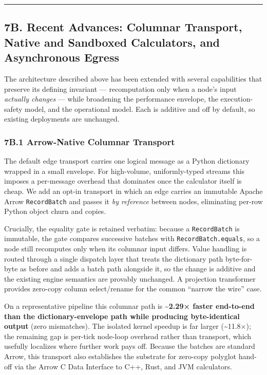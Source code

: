 \documentclass[
]{article}
\begin{document}
\begin{center}\rule{0.5\linewidth}{0.5pt}\end{center}

\hypertarget{b.-recent-advances-columnar-transport-native-and-sandboxed-calculators-and-asynchronous-egress}{%
\subsection{7B. Recent Advances: Columnar Transport, Native and
Sandboxed Calculators, and Asynchronous
Egress}\label{b.-recent-advances-columnar-transport-native-and-sandboxed-calculators-and-asynchronous-egress}}

The architecture described above has been extended with several
capabilities that preserve its defining invariant --- recomputation only
when a node's input \emph{actually changes} --- while broadening the
performance envelope, the execution-safety model, and the operational
model. Each is additive and off by default, so existing deployments are
unchanged.

\hypertarget{b.1-arrow-native-columnar-transport}{%
\subsubsection{7B.1 Arrow-Native Columnar
Transport}\label{b.1-arrow-native-columnar-transport}}

The default edge transport carries one logical message as a Python
dictionary wrapped in a small envelope. For high-volume, uniformly-typed
streams this imposes a per-message overhead that dominates once the
calculator itself is cheap. We add an opt-in transport in which an edge
carries an immutable Apache Arrow \texttt{RecordBatch} and passes it
\emph{by reference} between nodes, eliminating per-row Python object
churn and copies.

Crucially, the equality gate is retained verbatim: because a
\texttt{RecordBatch} is immutable, the gate compares successive batches
with \texttt{RecordBatch.equals}, so a node still recomputes only when
its columnar input differs. Value handling is routed through a single
dispatch layer that treats the dictionary path byte-for-byte as before
and adds a batch path alongside it, so the change is additive and the
existing engine semantics are provably unchanged. A projection
transformer provides zero-copy column select/rename for the common
``narrow the wire'' case.

On a representative pipeline this columnar path is
\textbf{\textasciitilde2.29× faster end-to-end than the
dictionary-envelope path while producing byte-identical output} (zero
mismatches). The isolated kernel speedup is far larger
(\textasciitilde11.8×); the remaining gap is per-tick node-loop overhead
rather than transport, which usefully localizes where further work pays
off. Because the batches are standard Arrow, this transport also
establishes the substrate for zero-copy polyglot hand-off via the Arrow
C Data Interface to C++, Rust, and JVM calculators.
\end{document}
